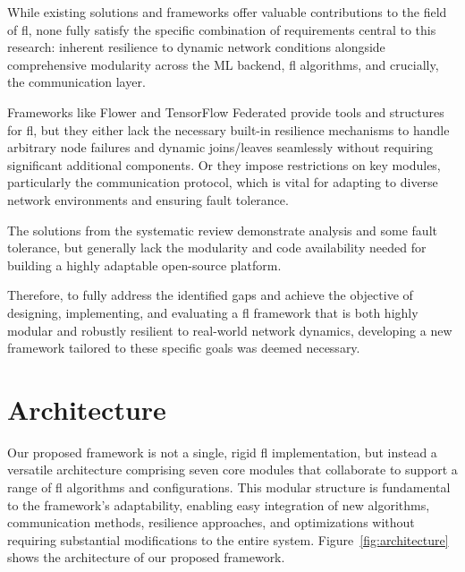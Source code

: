 While existing solutions and frameworks offer valuable contributions to the field of \ac{fl}, none fully satisfy the specific combination of requirements central to this research: inherent resilience to dynamic network conditions alongside comprehensive modularity across the ML backend, \ac{fl} algorithms, and crucially, the communication layer. 

Frameworks like Flower and TensorFlow Federated provide tools and structures for \ac{fl}, but they either lack the necessary built-in resilience mechanisms to handle arbitrary node failures and dynamic joins/leaves seamlessly without requiring significant additional components. Or they impose restrictions on key modules, particularly the communication protocol, which is vital for adapting to diverse network environments and ensuring fault tolerance. 

The solutions from the systematic review demonstrate analysis and some fault tolerance, but generally lack the modularity and code availability needed for building a highly adaptable open-source platform. 

Therefore, to fully address the identified gaps and achieve the objective of designing, implementing, and evaluating a \ac{fl} framework that is both highly modular and robustly resilient to real-world network dynamics, developing a new framework tailored to these specific goals was deemed necessary.



\section{Architecture}
\label{sec:architecture}

Our proposed framework is not a single, rigid \ac{fl} implementation, but instead a versatile architecture comprising seven core modules that collaborate to support a range of \ac{fl} algorithms and configurations. This modular structure is fundamental to the framework's adaptability, enabling easy integration of new algorithms, communication methods, resilience approaches, and optimizations without requiring substantial modifications to the entire system. Figure~\ref{fig:architecture} shows the architecture of our proposed framework. 

